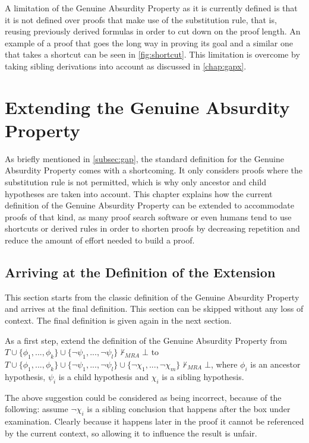 \documentclass[11pt,twoside,a4paper]{report}
\begin{document}
A limitation of the Genuine Absurdity Property as it is currently defined is that it is not defined over proofs that make use of the substitution rule, that is, reusing previously derived formulas in order to cut down on the proof length. An example of a proof that goes the long way in proving its goal and a similar one that takes a shortcut can be seen in \autoref{fig:shortcut}. This limitation is overcome by taking sibling derivations into account as discussed in \autoref{chap:gapx}.

\chapter{Extending the Genuine Absurdity Property}
\label{chap:gapx}
As briefly mentioned in \autoref{subsec:gap}, the standard definition for the Genuine Absurdity Property comes with a shortcoming. It only considers proofs where the substitution rule is not permitted, which is why only ancestor and child hypotheses are taken into account. This chapter explains how the current definition of the Genuine Absurdity Property can be extended to accommodate proofs of that kind, as many proof search software or even humans tend to use shortcuts or derived rules in order to shorten proofs by decreasing repetition and reduce the amount of effort needed to build a proof.

\section{Arriving at the Definition of the Extension}
This section starts from the classic definition of the Genuine Absurdity Property and arrives at the final definition. This section can be skipped without any loss of context. The final definition is given again in the next section.

As a first step, extend the definition of the Genuine Absurdity Property from $T\cup\{\phi_1, ..., \phi_k\}\cup\{\neg\psi_1, ..., \neg\psi_l\}\nvdash_{MRA}\bot$ to $T\cup\{\phi_1, ..., \phi_k\}\cup\{\neg\psi_1, ..., \neg\psi_l\}\cup\{\neg\chi_1, ..., \neg\chi_m\}\nvdash_{MRA}\bot$, where $\phi_i$ is an ancestor hypothesis, $\psi_i$ is a child hypothesis and $\chi_i$ is a sibling hypothesis.

The above suggestion could be considered as being incorrect, because of the following: assume $\neg\chi_i$ is a sibling conclusion that happens after the box under examination. Clearly because it happens later in the proof it cannot be referenced by the current context, so allowing it to influence the result is unfair.
\end{document}
